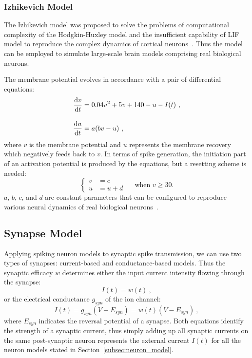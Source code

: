 \subsubsection{Izhikevich Model}
The Izhikevich model was proposed to solve the problems of computational complexity of the Hodgkin-Huxley model and the insufficient capability of LIF model to reproduce the complex dynamics of cortical neurons~\citep{izhikevich2003simple}.
Thus the model can be employed to simulate large-scale brain models comprising real biological neurons.

The membrane potential evolves in accordance with a pair of differential equations:
\begin{equation}
\begin{aligned}
\dfrac{\mathrm{d} v}{\mathrm{d} t} &= 0.04v^2 + 5v + 140 - u - I(t)~,\\[10pt]
\dfrac{\mathrm{d} u}{\mathrm{d} t} &= a(bv - u)~,
\end{aligned}
\end{equation}
where $v$ is the membrane potential and $u$ represents the membrane recovery which negatively feeds back to $v$.
In terms of spike generation, the initiation part of an activation potential is produced by the equations, but a resetting scheme is needed:
\begin{equation}
\left\{
\begin{aligned}
v &= c \\
u &= u + d
\end{aligned}
\right.
\textrm{~~~~when~} v \geq 30.
\end{equation}  
$a$, $b$, $c$, and $d$ are constant parameters that can be configured to reproduce various neural dynamics of real biological neurons~\citep{izhikevich2004model}.

\subsection{Synapse Model}
Applying spiking neuron models to synaptic spike transmission, we can use two types of synapses: current-based and conductance-based models.
Thus the synaptic efficacy $w$ determines either the input current intensity flowing through the synapse: %
\begin{equation}
I(t) = w(t)~,
\end{equation}
or the electrical conductance $g_{syn}$ of the ion channel: %
\begin{equation}
I(t) = g_{syn} (V-E_{syn}) = w(t) (V-E_{syn})~,
\end{equation}
where $E_{syn}$ indicates the reversal potential of a synapse.
Both equations identify the strength of a synaptic current, thus simply adding up all synaptic currents on the same post-synaptic neuron represents the external current $I(t)$ for all the neuron models stated in Section~\ref{subsec:neuron_model}.


